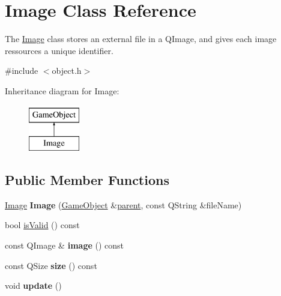 \hypertarget{class_image}{\section{\-Image \-Class \-Reference}
\label{class_image}
}


\-The \hyperlink{class_image}{\-Image} class stores an external file in a \-Q\-Image, and gives each image ressources a unique identifier.  




{\ttfamily \#include $<$object.\-h$>$}

\-Inheritance diagram for \-Image\-:\begin{figure}[H]
\begin{center}
\leavevmode
\includegraphics[height=2.000000cm]{class_image}
\end{center}
\end{figure}
\subsection*{\-Public \-Member \-Functions}
\begin{DoxyCompactItemize}
\item 
\hypertarget{class_image_a511f45f77d45768e2a2624b715ea8ec4}{\hyperlink{class_image}{\-Image} {\bfseries \-Image} (\hyperlink{class_game_object}{\-Game\-Object} \&\hyperlink{class_game_object_af3deaf39cde23c189765634e32e95bb4}{parent}, const \-Q\-String \&file\-Name)}\label{class_image_a511f45f77d45768e2a2624b715ea8ec4}

\item 
bool \hyperlink{class_image_a0bc052fef9ea98e416e11af385cd93b4}{is\-Valid} () const 
\item 
\hypertarget{class_image_abad14459f8cc7bea0ce1b9ce1c41bad1}{const \-Q\-Image \& {\bfseries image} () const }\label{class_image_abad14459f8cc7bea0ce1b9ce1c41bad1}

\item 
\hypertarget{class_image_a62eb0299b2a5109afb31321cba7d4fc8}{const \-Q\-Size {\bfseries size} () const }\label{class_image_a62eb0299b2a5109afb31321cba7d4fc8}

\item 
\hypertarget{class_image_aa4f881e18d7b454ca185c05ec8e70b6d}{void {\bfseries update} ()}\label{class_image_aa4f881e18d7b454ca185c05ec8e70b6d}

\end{DoxyCompactItemize}



